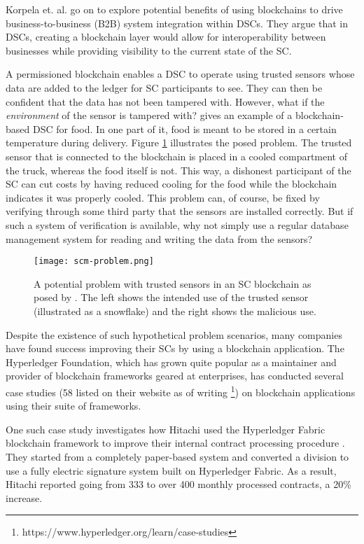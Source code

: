 Korpela et. al. go on to explore potential benefits of using
blockchains to drive business-to-business (B2B) system integration
within DSCs. They argue that in DSCs, creating a blockchain layer
would allow for interoperability between businesses while providing
visibility to the current state of the SC.

A permissioned blockchain enables a DSC to operate using trusted
sensors whose data are added to the ledger for SC participants to see.
They can then be confident that the data has not been tampered with.
However, what if the \textit{environment} of the sensor is tampered
with? \cite{wustBlockchainNeed} gives an example of a blockchain-based
DSC for food. In one part of it, food is meant to be stored in a
certain temperature during delivery. Figure \ref{fig:scm-problem}
illustrates the posed problem. The trusted sensor that is connected to
the blockchain is placed in a cooled compartment of the truck, whereas
the food itself is not. This way, a dishonest participant of the SC
can cut costs by having reduced cooling for the food while the
blockchain indicates it was properly cooled. This problem can, of
course, be fixed by verifying through some third party that the
sensors are installed correctly. But if such a system of verification
is available, why not simply use a regular database management system
for reading and writing the data from the sensors?

\begin{figure}
  \texttt{[image: scm-problem.png]}
  \caption{A potential problem with trusted sensors in an SC
  blockchain as posed by \cite{wustBlockchainNeed}. The left shows the
  intended use of the trusted sensor (illustrated as a snowflake) and
  the right
  shows the malicious use.}
  \label{fig:scm-problem}
\end{figure}

Despite the existence of such hypothetical problem scenarios, many
companies have found success improving their SCs by using a blockchain
application. The Hyperledger Foundation, which has grown quite popular
as a maintainer and provider of blockchain frameworks geared at
enterprises, has conducted several case studies (58 listed on their
website as of writing
\footnote{https://www.hyperledger.org/learn/case-studies}) on
blockchain applications using their suite of frameworks.

One such case study investigates how Hitachi used the Hyperledger
Fabric blockchain framework to improve their internal contract
processing procedure \cite{hyperledgerHitachi}. They started from a
completely paper-based system and converted a division to use a fully
electric signature system built on Hyperledger Fabric. As a result,
Hitachi reported going from 333 to over 400 monthly processed
contracts, a 20\% increase.

